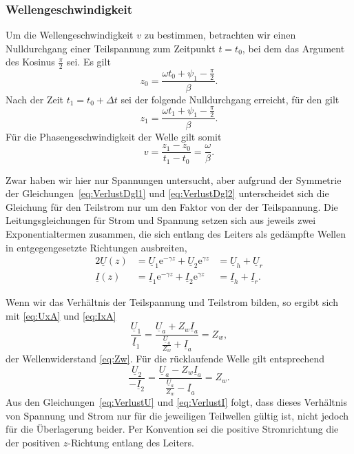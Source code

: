 \documentclass[paper=a4, parskip=half-, ngerman, fontsize=11pt]{scrreprt}
\begin{document}
\subsubsection{Wellengeschwindigkeit}

Um die Wellengeschwindigkeit $v$ zu bestimmen, betrachten wir einen Nulldurchgang einer Teilspannung zum Zeitpunkt
$t=t_{0}$, bei dem das Argument des Kosinus $\frac{\pi}{2}$ sei. Es gilt
\[ z_{0} = \frac{\omega t_{0} + \psi_{1} -\frac{\pi}{2}}{\beta}. \] Nach der Zeit $t_{1} = t_{0} + \Delta t$ sei der
folgende Nulldurchgang erreicht, für den gilt
\[ z_{1} = \frac{\omega t_{1} + \psi_{1} -\frac{\pi}{2}}{\beta}. \] Für die Phasengeschwindigkeit der Welle gilt somit
\[ v = \frac{z_{1} - z_{0}}{t_{1} - t_{0}} = \frac{\omega}{\beta}. \]

Zwar haben wir hier nur Spannungen untersucht, aber aufgrund der Symmetrie der Gleichungen~\eqref{eq:VerlustDgl1} und
\eqref{eq:VerlustDgl2} unterscheidet sich die Gleichung für den Teilstrom nur um den Faktor von der der Teilspannung.
Die Leitungsgleichungen für Strom und Spannung setzen sich aus jeweils zwei Exponentialtermen zusammen, die sich
entlang des Leiters als gedämpfte Wellen in entgegengesetzte Richtungen ausbreiten,
\begin{alignat*}{2}
\underline{U}(z) &= \underline{U}_{1} \mathrm{e}^{- \gamma z} + \underline{U}_{2} \mathrm{e}^{\gamma z}
&= \underline{U}_{h} + \underline{U}_{r} \\[1ex]
\underline{I}(z) &= \underline{I}_{1} \mathrm{e}^{- \gamma z} + \underline{I}_{2} \mathrm{e}^{\gamma z}
&= \underline{I}_{h} + \underline{I}_{r}.
\end{alignat*}

Wenn wir das Verhältnis der Teilspannung und Teilstrom bilden, so ergibt sich mit \eqref{eq:UxA} und \eqref{eq:IxA}
\[ \frac{\underline{U}_{1}}{\underline{I}_{1}} = \frac{\underline{U}_{a} + Z_{w}
\underline{I}_{a}}{\frac{\underline{U}_{a}}{Z_{w}} + \underline{I}_{a}} = Z_{w}, \]
der Wellenwiderstand \eqref{eq:Zw}. Für die rücklaufende Welle gilt entsprechend
\[ \frac{\underline{U}_{2}}{-\underline{I}_{2}} = \frac{\underline{U}_{a} - Z_{w}
\underline{I}_{a}}{\frac{\underline{U}_{a}}{Z_{w}} - \underline{I}_{a}} = Z_{w}. \]
Aus den Gleichungen~\eqref{eq:VerlustU} und \eqref{eq:VerlustI} folgt, dass dieses Verhältnis von Spannung und Strom
nur für die jeweiligen Teilwellen gültig ist, nicht jedoch für die Überlagerung beider. Per Konvention sei die positive
Stromrichtung die der positiven $z$-Richtung entlang des Leiters.
\end{document}
